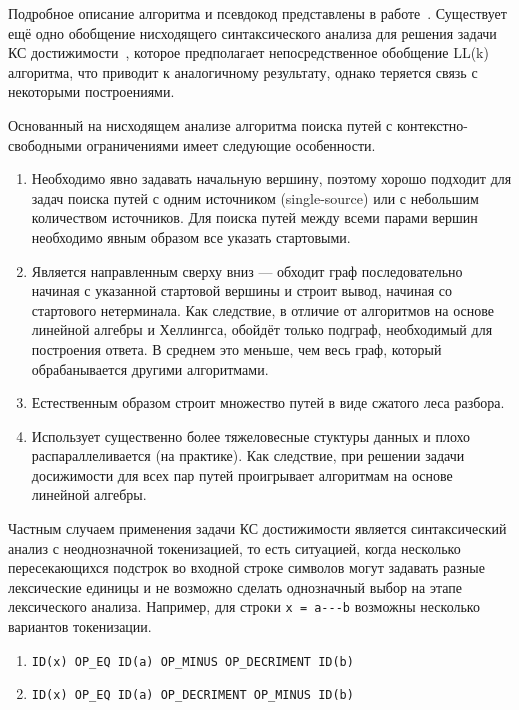 Подробное описание алгоритма и псевдокод представлены в работе~\cite{Grigorev:2017:CPQ:3166094.3166104}. Существует ещё одно обобщение нисходящего синтаксического анализа для решения задачи КС достижимости~\cite{MEDEIROS201975}, которое предполагает непосредственное обобщение LL(k) алгоритма, что приводит к аналогичному результату, однако теряется связь с некоторыми построениями. 

Основанный на нисходящем анализе алгоритма поиска путей с контекстно-свободными ограничениями имеет следующие особенности.
\begin{enumerate}
  \item Необходимо явно задавать начальную вершину, поэтому хорошо подходит для задач поиска путей с одним источником (single-source) или с небольшим количеством источников. Для поиска путей между всеми парами вершин необходимо явным образом все указать стартовыми.
  \item Является направленным сверху вниз --- обходит граф последовательно начиная с указанной стартовой вершины и строит вывод, начиная со стартового нетерминала. Как следствие, в отличие от алгоритмов на основе линейной алгебры и Хеллингса, обойдёт только подграф, необходимый для построения ответа. В среднем это меньше, чем весь граф, который обрабанывается другими алгоритмами.
  \item Естественным образом строит множество путей в виде сжатого леса разбора.
  \item Использует существенно более тяжеловесные стуктуры данных и плохо распараллеливается (на практике). Как следствие, при решении задачи досижимости для всех пар путей проигрывает алгоритмам на основе линейной алгебры.
\end{enumerate}

Частным случаем применения задачи КС достижимости является синтаксический анализ с неоднозначной токенизацией, то есть ситуацией, когда несколько пересекающихся подстрок во входной строке символов могут задавать разные лексические единицы и не возможно сделать однозначный выбор на этапе лексического анализа.
Например, для строки \verb|x = a---b| возможны несколько вариантов токенизации.
\begin{enumerate}
  \item \verb|ID(x) OP_EQ ID(a) OP_MINUS OP_DECRIMENT ID(b)|
  \item \verb|ID(x) OP_EQ ID(a) OP_DECRIMENT OP_MINUS ID(b)|  
\end{enumerate} 

